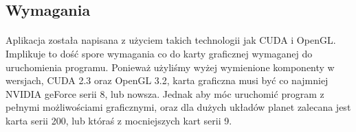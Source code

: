 \subsection{Wymagania}\label{sub:wymagania}
\paragraph{}

Aplikacja została napisana z użyciem takich technologii jak CUDA i OpenGL. Implikuje to dość spore wymagania co do karty graficznej wymaganej do uruchomienia programu. Ponieważ użyliśmy wyżej wymienione komponenty w wersjach, CUDA 2.3 oraz OpenGL 3.2, karta graficzna musi być co najmniej NVIDIA geForce serii 8, lub nowsza. Jednak aby móc uruchomić program z pełnymi możliwościami graficznymi, oraz dla dużych układów planet zalecana jest karta serii 200, lub któraś z mocniejszych kart serii 9.

\paragraph{}




